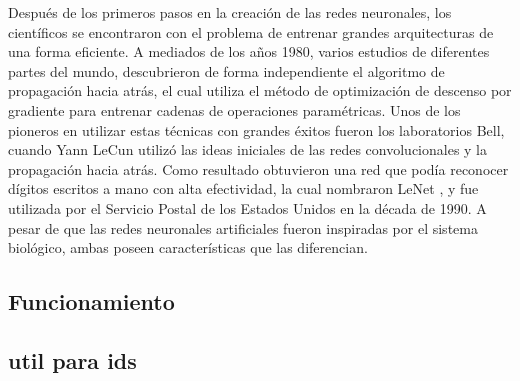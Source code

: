 Después de los primeros pasos en la creación de las redes neuronales, los científicos se encontraron con el problema de entrenar grandes arquitecturas de una forma eficiente. A mediados de los a\~nos 1980, varios estudios de diferentes partes del mundo, descubrieron de forma independiente el algoritmo de propagación hacia atrás, el cual utiliza el método de optimizaci\'on de descenso por gradiente para entrenar cadenas de operaciones param\'etricas. Unos de los pioneros en utilizar estas técnicas con grandes éxitos fueron los laboratorios Bell, cuando Yann LeCun utilizó las ideas iniciales de las redes convolucionales y la propagación hacia atrás. Como resultado obtuvieron una red que podía reconocer dígitos escritos a mano con alta efectividad, la cual nombraron LeNet \cite{lecun1995comparison}, y fue utilizada por el Servicio Postal de los Estados Unidos en la década de 1990. A pesar de que las redes neuronales artificiales fueron inspiradas por el sistema biológico, ambas poseen características que las diferencian.


\subsection{Funcionamiento}


\subsection{util para ids}





